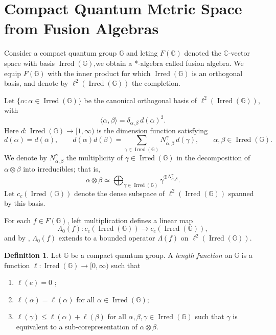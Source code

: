\documentclass[12pt, reqno]{amsart}
\theoremstyle{definition}
\newtheorem{definition}[theorem]{Definition}
\theoremstyle{remark}
\numberwithin{equation}{section}
\begin{document}
\section{Compact Quantum Metric Space from Fusion Algebras}



Consider a compact quantum group $\mathbb{G}$ and leting $F(\mathbb{G})$ denoted the $\mathbb{C}$-vector space with basis $\operatorname{Irred}(\mathbb{G})$,we obtain a *-algebra called fusion algebra.
We equip $F(\mathbb{G})$ with the inner product for which
$\operatorname{Irred}(\mathbb{G})$ is an orthogonal basis, and denote by
$\ell^{2}(\operatorname{Irred}(\mathbb{G}))$ the completion.

Let $\{\alpha : \alpha \in \operatorname{Irred}(\mathbb{G})\}$ be the
canonical orthogonal basis of $\ell^{2}(\operatorname{Irred}(\mathbb{G}))$,
with
\[
\langle \alpha,\beta\rangle = \delta_{\alpha,\beta}\, d(\alpha)^2.
\]
Here $d:\operatorname{Irred}(\mathbb{G})\to [1,\infty)$ is the dimension
function satisfying
\[
d(\alpha)=d(\bar{\alpha}), \qquad
d(\alpha)d(\beta)=\sum_{\gamma\in \operatorname{Irred}(\mathbb{G})}
N_{\alpha,\beta}^{\gamma}\, d(\gamma),
\qquad \alpha,\beta\in \operatorname{Irred}(\mathbb{G}).
\]
We denote by $N_{\alpha,\beta}^{\gamma}$ the multiplicity of
$\gamma \in \operatorname{Irred}(\mathbb{G})$ in the decomposition of
$\alpha \otimes \beta$ into irreducibles; that is,
\begin{equation}
\alpha \otimes \beta \simeq
\bigoplus_{\gamma \in \operatorname{Irred}(\mathbb{G})}
\gamma^{\oplus N_{\alpha,\beta}^{\gamma}}.
\tag{3.1}
\end{equation}
Let $c_{c}(\operatorname{Irred}(\mathbb{G}))$ denote the dense subspace of
$\ell^{2}(\operatorname{Irred}(\mathbb{G}))$ spanned by this basis.

For each $f \in F(\mathbb{G})$, left multiplication defines a linear map
\[
\Lambda_{0}(f) \colon c_{c}(\operatorname{Irred}(\mathbb{G}))
\longrightarrow c_{c}(\operatorname{Irred}(\mathbb{G})),
\]
and by \cite[Lemma~3.3]{16}, $\Lambda_{0}(f)$ extends to a bounded operator
$\Lambda(f)$ on $\ell^{2}(\operatorname{Irred}(\mathbb{G}))$.


\begin{definition}\label{def:length}
Let $\mathbb{G}$ be a compact quantum group. A \emph{length function} on 
$\mathbb{G}$ is a function 
$\ell \colon \operatorname{Irred}(\mathbb{G}) \to [0,\infty)$ such that
\begin{enumerate}
    \item[(i)] $\ell(e) = 0$ ;
    \item[(ii)] $\ell(\bar{\alpha}) = \ell(\alpha)$ for all 
    $\alpha \in \operatorname{Irred}(\mathbb{G})$;
    \item[(iii)] $\ell(\gamma) \leq \ell(\alpha) + \ell(\beta)$ for all 
    $\alpha, \beta, \gamma \in \operatorname{Irred}(\mathbb{G})$ such that 
    $\gamma$ is equivalent to a sub-corepresentation of 
    $\alpha \otimes \beta$.
\end{enumerate}
\end{definition}
\end{document}

